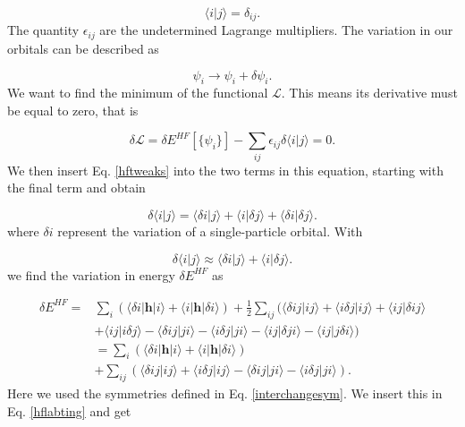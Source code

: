 \documentclass[a4paper,norsk,11pt,twoside]{report}
\begin{document}
\begin{equation}
\langle i | j \rangle = \delta_{ij} .
\end{equation}
The quantity 
$\epsilon_{ij}$ are the undetermined Lagrange multipliers. The variation in our orbitals can be described as

\begin{equation}
\psi_i \rightarrow \psi_i + \delta \psi_i .
\label{hftweaks}
\end{equation}
We want to find the minimum of the functional $\mathcal{L}$. This means its derivative must be equal to zero, that is

\begin{equation}
\delta \mathcal{L} = 
\delta E^{HF}[\{\psi_i\}] 
- \sum_{ij} \epsilon_{ij} \delta \langle i | j \rangle
= 0 . \label{hflabting}
\end{equation}
We then insert Eq. \eqref{hftweaks} into the two terms in this equation, starting with the final term and obtain

\begin{equation}
\delta \langle i | j \rangle = 
\langle \delta i | j \rangle
+ \langle i | \delta j \rangle
+ \langle \delta i | \delta j \rangle .
\end{equation}
where $\delta i$ represent the variation of a single-particle orbital. With 

\begin{equation}
\delta \langle i | j \rangle \approx 
\langle \delta i | j \rangle
+ \langle i | \delta j \rangle .
\end{equation}
we find the variation in energy $\delta E^{HF}$ as

\begin{align}
\delta E^{HF} = & 
\sum_i \left( \langle \delta i | \textbf{h} | i \rangle
 + \langle i | \textbf{h} | \delta i \rangle \right)
 + \frac{1}{2} \sum_{ij} (
 \langle \delta i j | i j \rangle
 + \langle i \delta j | i j \rangle
 + \langle  i j | \delta i j \rangle \nonumber \\ &
 + \langle  i j | i \delta j \rangle
 - \langle \delta i j | j i \rangle 
 - \langle i \delta j | j i \rangle 
 - \langle i j | \delta  j i \rangle 
 - \langle i j | j \delta i \rangle )
 \nonumber \\ &
 = \sum_i (
 \langle \delta i | \textbf{h} | i \rangle
 + \langle i | \textbf{h} | \delta i \rangle ) \nonumber \\ &
 + \sum_{ij} (
 \langle \delta i j | i j \rangle 
 + \langle  i \delta j | i j \rangle
 - \langle \delta i j | j i \rangle 
 - \langle i \delta j | j i \rangle ) .
\end{align}
Here we used the symmetries defined in Eq. \eqref{interchangesym}. We insert this in Eq. \eqref{hflabting} and get
\end{document}
